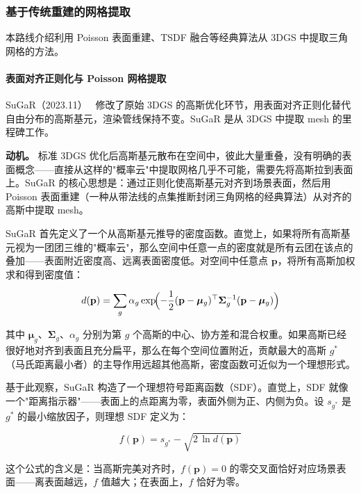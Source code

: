 \subsubsection{基于传统重建的网格提取}
\label{subsec:04_4_2}

本路线介绍利用 Poisson 表面重建、TSDF 融合等经典算法从 3DGS 中提取三角网格的方法。

\paragraph{表面对齐正则化与 Poisson 网格提取}

SuGaR（2023.11）~\cite{2311_12775} 修改了原始 3DGS 的高斯优化环节，用表面对齐正则化替代自由分布的高斯基元，渲染管线保持不变。SuGaR 是从 3DGS 中提取 mesh 的里程碑工作。

\textbf{动机。} 标准 3DGS 优化后高斯基元散布在空间中，彼此大量重叠，没有明确的表面概念——直接从这样的"概率云"中提取网格几乎不可能，需要先将高斯拉到表面上。SuGaR 的核心思想是：通过正则化使高斯基元对齐到场景表面，然后用 Poisson 表面重建（一种从带法线的点集推断封闭三角网格的经典算法）从对齐的高斯中提取 mesh。

SuGaR 首先定义了一个从高斯基元推导的密度函数。直觉上，如果将所有高斯基元视为一团团三维的"概率云"，那么空间中任意一点的密度就是所有云团在该点的叠加——表面附近密度高、远离表面密度低。对空间中任意点 $\mathbf{p}$，将所有高斯加权求和得到密度值：

\begin{equation}
d(\mathbf{p}) = \sum_g \alpha_g \exp\!\Bigl(-\frac{1}{2}(\mathbf{p} - \boldsymbol{\mu}_g)^\top \boldsymbol{\Sigma}_g^{-1} (\mathbf{p} - \boldsymbol{\mu}_g)\Bigr)
\end{equation}

其中 $\boldsymbol{\mu}_g$、$\boldsymbol{\Sigma}_g$、$\alpha_g$ 分别为第 $g$ 个高斯的中心、协方差和混合权重。如果高斯已经很好地对齐到表面且充分扁平，那么在每个空间位置附近，贡献最大的高斯 $g^*$（马氏距离最小者）的主导作用远超其他高斯，密度函数可近似为一个理想形式。

基于此观察，SuGaR 构造了一个理想符号距离函数（SDF）。直觉上，SDF 就像一个"距离指示器"——表面上的点距离为零，表面外侧为正、内侧为负。设 $s_{g^*}$ 是 $g^*$ 的最小缩放因子，则理想 SDF 定义为：

\begin{equation}
f(\mathbf{p}) = s_{g^*} - \sqrt{2\,\ln d(\mathbf{p})}
\end{equation}

这个公式的含义是：当高斯完美对齐时，$f(\mathbf{p})=0$ 的零交叉面恰好对应场景表面——离表面越远，$f$ 值越大；在表面上，$f$ 恰好为零。

